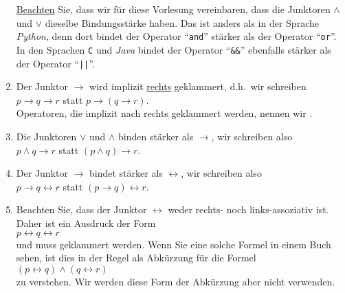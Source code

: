 \begin{enumerate}
      \underline{\color{red}Beachten} Sie, dass wir für diese Vorlesung vereinbaren, dass die Junktoren
      $\wedge$ und $\vee$ dieselbe Bindungsstärke haben.  Das ist anders als in der Sprache \textsl{Python},
      denn dort bindet der Operator ``\texttt{and}'' stärker als der Operator ``\texttt{or}''.
      In den Sprachen \texttt{C} und \textsl{Java} bindet der Operator ``\texttt{\&\&}'' ebenfalls stärker als
      der Operator ``\texttt{||}''. 
\item Der Junktor $\rightarrow$ wird implizit \underline{rechts} geklammert, d.h.~wir
      schreiben \\[0.2cm]
      \hspace*{1.3cm} $p \rightarrow q \rightarrow r$ \quad statt \quad $p \rightarrow (q \rightarrow r)$.
      \\[0.2cm]
      Operatoren, die implizit nach rechts geklammert werden, nennen wir
      . 
\item Die Junktoren $\vee$ und $\wedge$ binden stärker als $\rightarrow$, wir schreiben
      also \\[0.2cm]
      \hspace*{1.3cm} $p \wedge q \rightarrow r$ \quad statt \quad $(p \wedge q) \rightarrow r$.
\item Der Junktor $\rightarrow$ bindet stärker als $\leftrightarrow$, wir schreiben
      also \\[0.2cm]
      \hspace*{1.3cm} $p \rightarrow q \leftrightarrow r$ \quad statt \quad $(p \rightarrow q) \leftrightarrow
      r$.
\item Beachten Sie, dass der Junktor $\leftrightarrow$ weder rechts- noch links-assoziativ ist.  Daher ist ein
      Ausdruck der Form
      \\[0.2cm]
      \hspace*{1.3cm}
      $p \leftrightarrow q \leftrightarrow r$
      \\[0.2cm]
      \underline{} und muss geklammert werden.  Wenn Sie eine solche Formel in einem Buch sehen, ist dies
      in der Regel als Abkürzung für die Formel
      \\[0.2cm]
      \hspace*{1.3cm}
      $(p \leftrightarrow q) \wedge (q \leftrightarrow r)$
      \\[0.2cm]
      zu verstehen.  Wir werden diese Form der Abkürzung aber nicht verwenden.
\end{enumerate}

